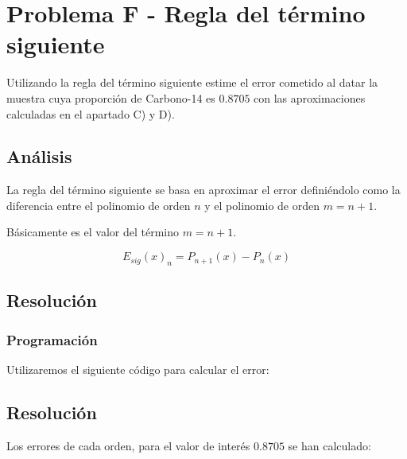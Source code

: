 \section{Problema F - Regla del término siguiente}
Utilizando la regla del término siguiente estime el error cometido al datar la muestra cuya proporción de Carbono-14 es $0.8705$ con las aproximaciones calculadas en el apartado C) y D).

\subsection{Análisis}

La regla del término siguiente se basa en aproximar el error definiéndolo como la diferencia entre el polinomio de orden $n$ y el polinomio de orden $m = n + 1$.

Básicamente es el valor del término $m = n + 1$.


$$ E_{sig}(x)_n = P_{n+1}(x) - P_{n}(x) $$

\subsection{Resolución}

\subsubsection{Programación}

Utilizaremos el siguiente código para calcular el error:



\newpage 

\subsection{Resolución}

Los errores de cada orden, para el valor de interés $0.8705$ se han calculado:

\begin{table}[htbp]
	\centering
\end{table}

